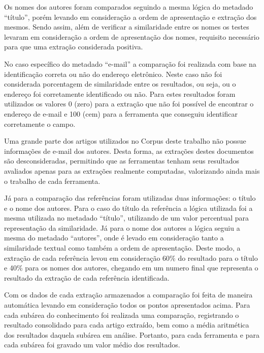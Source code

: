 Os nomes dos autores foram comparados seguindo a mesma lógica do metadado ``título'', porém levando em consideração a ordem de apresentação e extração dos mesmos. Sendo assim, além de verificar a similaridade entre os nomes os testes levaram em consideração a ordem de apresentação dos nomes, requisito necessário para que uma extração considerada positiva.


No caso específico do metadado ``e-mail'' a comparação foi realizada com base na identificação correta ou não do endereço eletrônico. Neste caso não foi considerada porcentagem de similaridade entre os resultados, ou seja, ou o endereço foi corretamente identificado ou não. Para estes resultados foram utilizados os valores 0 (zero) para a extração que não foi possível de encontrar o endereço de e-mail e 100 (cem) para a ferramenta que conseguiu identificar corretamente o campo.


Uma grande parte dos artigos utilizados no Corpus deste trabalho não possue informações de e-mail dos autores. Desta forma, as extrações destes documentos são desconsideradas, permitindo que as ferramentas tenham seus resultados avaliados apenas para as extrações realmente computadas, valorizando ainda mais o trabalho de cada ferramenta.

Já para a comparação das referências foram utilizadas duas informações: o título e o nome dos autores. Para o caso do título da referência a lógica utilizada foi a mesma utilizada no metadado ``título'', utilizando de um valor percentual para representação da similaridade. Já para o nome dos autores a lógica seguiu a mesma do metadado ``autores'', onde é levado em consideração tanto a similaridade textual como também a ordem de apresentação. Deste modo, a extração de cada referência levou em consideração 60\% do resultado para o título e 40\% para os nomes dos autores, chegando em um numero final que representa o resultado da extração de cada referência identificada.


Com os dados de cada extração armazenados a comparação foi feita de maneira automática levando em consideração todos os pontos apresentados acima. Para cada subárea do conhecimento foi realizada uma comparação, registrando o resultado consolidado para cada artigo extraído, bem como a média aritmética dos resultados daquela subárea em análise. Portanto, para cada ferramenta e para cada subárea foi gravado um valor médio dos resultados.

